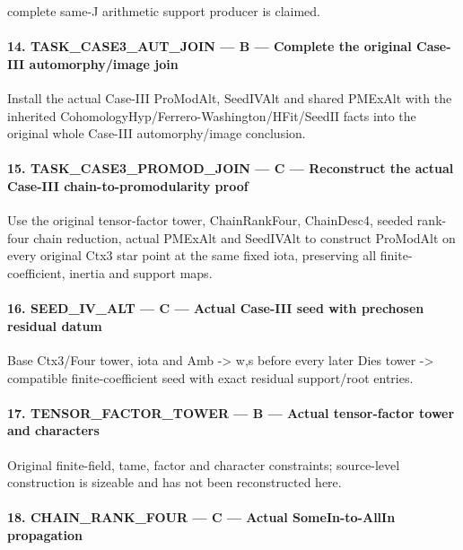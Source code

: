 complete same-J arithmetic support producer is claimed.

\paragraph{14. TASK\_\allowbreak{}CASE3\_\allowbreak{}AUT\_\allowbreak{}JOIN — B — Complete the original Case-III automorphy/\allowbreak{}image join}

Install the actual Case-III ProModAlt, SeedIVAlt and shared PMExAlt with the inherited CohomologyHyp/\allowbreak{}Ferrero-Washington/\allowbreak{}HFit/\allowbreak{}SeedII facts into the original whole Case-III automorphy/\allowbreak{}image conclusion.

\paragraph{15. TASK\_\allowbreak{}CASE3\_\allowbreak{}PROMOD\_\allowbreak{}JOIN — C — Reconstruct the actual Case-III chain-to-promodularity proof}

Use the original tensor-factor tower, ChainRankFour, ChainDesc4, seeded rank-four chain reduction, actual PMExAlt and SeedIVAlt to construct ProModAlt on every original Ctx3 star point at the same fixed iota, preserving all finite-coefficient, inertia and support maps.

\paragraph{16. SEED\_\allowbreak{}IV\_\allowbreak{}ALT — C — Actual Case-III seed with prechosen residual datum}

Base Ctx3/\allowbreak{}Four tower, iota and Amb -> w,s before every later Dies tower -> compatible finite-coefficient seed with exact residual support/\allowbreak{}root entries.

\paragraph{17. TENSOR\_\allowbreak{}FACTOR\_\allowbreak{}TOWER — B — Actual tensor-factor tower and characters}

Original finite-field, tame, factor and character constraints; source-level construction is sizeable and has not been reconstructed here.

\paragraph{18. CHAIN\_\allowbreak{}RANK\_\allowbreak{}FOUR — C — Actual SomeIn-to-AllIn propagation}

